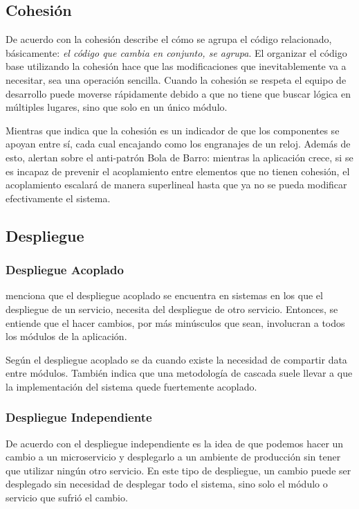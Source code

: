 \subsection{Cohesión}

De acuerdo con \cite{newman2019monolith} la cohesión describe el cómo se agrupa el código relacionado,
básicamente: {\it el código que cambia en conjunto, se agrupa}.
El organizar el código base utilizando la cohesión hace que las modificaciones que inevitablemente
va a necesitar, sea una operación sencilla.
Cuando la cohesión se respeta el equipo de desarrollo puede moverse rápidamente debido a que no tiene
que buscar lógica en múltiples lugares, sino que solo en un único módulo.

Mientras que \cite{percival2020architecture} indica que la cohesión es un indicador de que los componentes
se apoyan entre sí, cada cual encajando como los engranajes de un reloj.
Además de esto, alertan sobre el anti-patrón Bola de Barro: mientras la aplicación crece, si se es incapaz de
prevenir el acoplamiento entre elementos que no tienen cohesión, el acoplamiento escalará de manera superlineal
hasta que ya no se pueda modificar efectivamente el sistema.


\subsection{Despliegue}


\subsubsection{Despliegue Acoplado}

\cite{newman2019monolith} menciona que el despliegue acoplado se encuentra en sistemas en los que el
despliegue de un servicio, necesita del despliegue de otro servicio.
Entonces, se entiende que el hacer cambios, por más minúsculos que sean, involucran a todos los módulos
de la aplicación.

Según \cite{nadareishvili2016microservice} el despliegue acoplado se da cuando existe la necesidad
de compartir data entre módulos.
También indica que una metodología de cascada suele llevar a que la implementación del sistema
quede fuertemente acoplado.


\subsubsection{Despliegue Independiente}

De acuerdo con \cite{newman2019monolith} el despliegue independiente es la idea de que podemos
hacer un cambio a un microservicio y desplegarlo a un ambiente de producción sin tener que utilizar
ningún otro servicio.
En este tipo de despliegue, un cambio puede ser desplegado sin necesidad de desplegar todo el sistema,
sino solo el módulo o servicio que sufrió el cambio.

